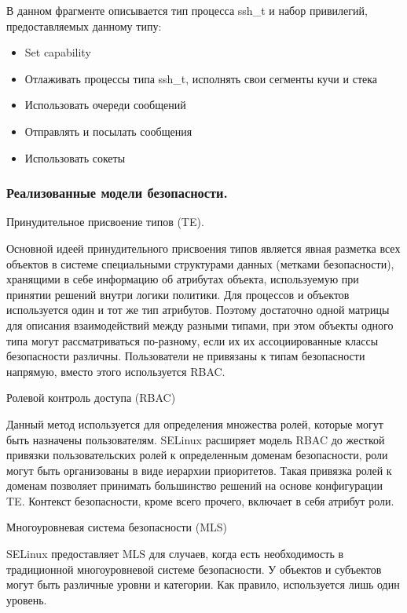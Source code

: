 
В данном фрагменте описывается тип процесса ssh\_t и
набор привилегий, предоставляемых данному типу:
\begin{itemize}
\item Set capability
\item Отлаживать процессы типа ssh\_t, исполнять свои сегменты
        кучи и стека
\item Использовать очереди сообщений
\item Отправлять и посылать сообщения
\item Использовать сокеты
\end{itemize}

\subsubsection {Реализованные модели безопасности.} 

Принудительное присвоение типов (TE). 

Основной идеей принудительного присвоения
типов является явная разметка всех объектов 
в системе специальными структурами данных 
(метками безопасности), хранящими в себе информацию
об атрибутах объекта, используемую при принятии 
решений внутри логики политики. 
Для процессов и объектов используется 
один и тот же тип атрибутов. Поэтому достаточно 
одной матрицы для описания взаимодействий между 
разными типами, при этом объекты одного типа могут 
рассматриваться по-разному, если их их ассоциированные 
классы безопасности различны. Пользователи не 
привязаны к типам безопасности напрямую, вместо 
этого используется RBAC.

\bigskip
Ролевой контроль доступа (RBAC) 

Данный метод используется для определения 
множества ролей, которые могут 
быть назначены пользователям. SELinux расширяет 
модель RBAC до жесткой привязки пользовательских 
ролей к определенным доменам безопасности, роли 
могут быть организованы в виде иерархии приоритетов. 
Такая привязка ролей к доменам позволяет принимать 
большинство решений на основе конфигурации TE. 
Контекст безопасности, кроме всего прочего, включает 
в себя атрибут роли.

\bigskip
Многоуровневая система безопасности (MLS) 

SELinux предоставляет MLS для случаев, когда есть 
необходимость в традиционной многоуровневой системе 
безопасности. У объектов и субъектов могут быть 
различные уровни и категории. 
Как правило, используется лишь один уровень. 


